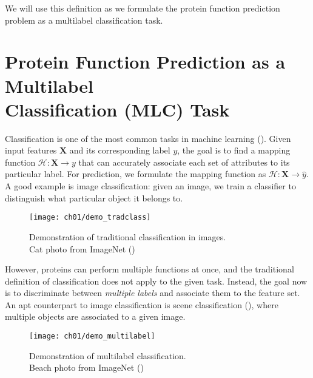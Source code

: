 \par We will use this definition as we formulate the protein function
prediction problem as a multilabel classification task.


\section[Protein Function Prediction as a Multilabel Classification Task]
{Protein Function Prediction as a Multilabel\\Classification  (MLC) Task}
\label{MultilabelClassification}

\par Classification is one of the most common tasks in machine learning
(\cite{herrera2016multilabel}). Given input features $\mathbf{X}$ and its
corresponding label $y$, the goal is to find a mapping function $\mathcal{H}:
\mathbf{X} \rightarrow y$ that can accurately associate each set of
attributes to its particular label. For prediction, we formulate the mapping
function as $\mathcal{H}: \mathbf{X} \rightarrow \widehat{y}$. A good example
is image classification: given an image, we train a classifier to distinguish
what particular object it belongs to.

\begin{figure}[!h]
  \centering
  \texttt{[image: ch01/demo\_tradclass]}
  \caption[Demonstration of traditional classification in images]
  {Demonstration of traditional classification in images.\\Cat photo
  from ImageNet (\cite{russakovsky2015imagenet})}
  \label{demo:traditional}
\end{figure}

\par However, proteins can perform multiple functions at once, and the
traditional definition of classification does not apply to the given task.
Instead, the goal now is to discriminate between \textit{multiple labels} and
associate them to the feature set. An apt counterpart to image classification
is scene classification (\cite{boutell2004learning}), where multiple objects
are associated to a given image.

\begin{figure}[!h]
  \centering
  \texttt{[image: ch01/demo\_multilabel]}
  \caption[Demonstration of multilabel classification]
  {Demonstration of multilabel classification.\\Beach photo
  from ImageNet (\cite{russakovsky2015imagenet})}
  \label{demo:multilabel}
\end{figure}

